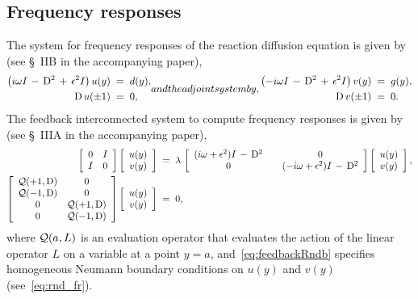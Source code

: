 \documentclass[%
secnumarabic,%
 amssymb, amsmath,%
 aps,prf,superscriptaddress,longbibliography
frontmatterverbose,
]{revtex4-2}
\begin{document}
\subsection{Frequency responses}
The system for frequency responses of the reaction diffusion equation is given by (see \S~IIB in the accompanying paper),
\begin{subequations}\label{eq:rnd_fr}
\begin{align}\label{eq:rnd_frop}
   \left( i \omega I \,-\, \D^2 \, + \, \epsilon^2 I \right) u(y) \;&=\; d(y),\\
 \D\, u (\pm 1) \;&=\; 0,
\end{align} 
and the adjoint system by,
\begin{align}\label{eq:rnd_fropAd}
  \left( -i \omega I \,-\, \D^2 \, + \, \epsilon^2 I \right) v(y) \;&=\; g(y),\\
\D\, v (\pm 1) \;&=\; 0.
\end{align} 
\end{subequations}
The feedback interconnected system to compute frequency responses is given by (see \S~IIIA in the accompanying paper),
\begin{subequations}\label{eq:feedbackRnd}
\begin{align}
  \left[\begin{array}{cc}
    0 & I\\
    I & 0
  \end{array}\right]\left[\begin{array}{c}
    u(y)\\
    v(y)
  \end{array}\right]\;&=\;\lambda \,\left[\begin{array}{ccc}
    (i \omega + \epsilon^2) I \,-\, \mathrm D^2 & & 0\\
    0 && (-i \omega + \epsilon^2) I \,-\, \mathrm D^2
  \end{array}\right] \left[\begin{array}{c}
    u(y)\\
    v(y)
  \end{array}\right],\label{eq:feedbackRnda}\\
  \left[\begin{array}{cc}
    \mathcal{Q}(+1,\mathrm D) & 0\\
    \mathcal{Q}(-1,\mathrm D)& 0\\
    0 & \mathcal{Q}(+1,\mathrm D)\\
    0 & \mathcal{Q}(-1,\mathrm D)
  \end{array}\right]\left[\begin{array}{c}
    u(y)\\
    v(y)
  \end{array}\right] \;&=\; 0, \label{eq:feedbackRndb}
\end{align}
\end{subequations}
where $\mathcal{Q}(a,L)$ is an evaluation operator that evaluates the action of the linear operator $L$ on a variable at a point $y = a$, and~\eqref{eq:feedbackRndb} specifies homogeneous Neumann boundary conditions on $u(y)$ and $v(y)$ (see~\eqref{eq:rnd_fr}).
\end{document}
